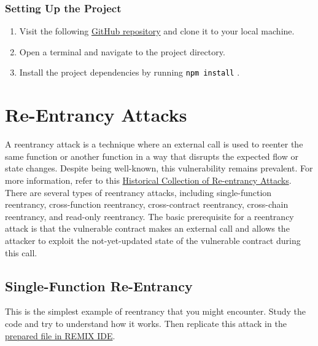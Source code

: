 \documentclass[12pt]{article}
\newcommand{\codegrey}[1]{%
  \texttt{\colorbox{black!4}{\textcolor{black}{#1}}}%
}
\begin{document}
\subsubsection*{Setting Up the Project}

\begin{enumerate}
    \item Visit the following
          \href{https://github.com/radovluk/Smart-Contract-Exercise/tree/main/05-Re-Entrancy/task/task-code}{GitHub
              repository} and clone it to your local machine.
    \item Open a terminal and navigate to the project directory.
    \item Install the project dependencies by running \codegrey{npm install}.
\end{enumerate}

\section{Re-Entrancy Attacks}

A reentrancy attack is a technique where an external call is used to reenter
the same function or another function in a way that disrupts the expected flow
or state changes. Despite being well-known, this vulnerability remains
prevalent. For more information, refer to this
\href{https://github.com/pcaversaccio/reentrancy-attacks?tab=readme-ov-file}{Historical
    Collection of Re-entrancy Attacks}. There are several types of reentrancy
attacks, including single-function reentrancy, cross-function reentrancy,
cross-contract reentrancy, cross-chain reentrancy, and read-only reentrancy.
The basic prerequisite for a reentrancy attack is that the vulnerable contract
makes an external call and allows the attacker to exploit the not-yet-updated
state of the vulnerable contract during this call.

\subsection{Single-Function Re-Entrancy}

This is the simplest example of reentrancy that you might encounter. Study the
code and try to understand how it works. Then replicate this attack in the
\href{https://remix.ethereum.org/?#activate=solidity&url=https://github.com/radovluk/unbreakable-vault/contracts/reentrancy01.sol&lang=en&optimize=false&runs=200&evmVersion=null&version=soljson-v0.8.28+commit.7893614a.js}{prepared
    file in REMIX IDE}.
\end{document}
